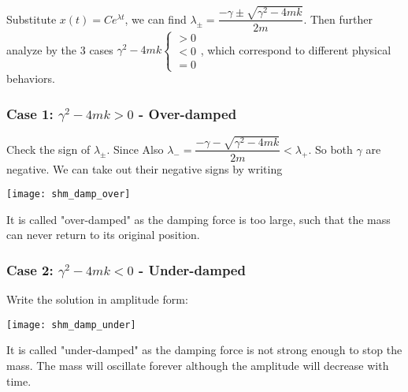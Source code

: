 \documentclass[class=article, crop=false, 12pt]{standalone}
\begin{document}
Substitute $x(t) = Ce^{\lambda t}$, we can find $\lambda_\pm = \dfrac{-\gamma \pm \sqrt{\gamma^2-4mk}}{2m}$.
Then further analyze by the 3 cases 
$\gamma^2-4mk
\begin{cases}
    >0 \\ <0 \\ =0
\end{cases}
$,
which correspond to different physical behaviors.


\subsubsection{Case 1: $\gamma^2-4mk>0$ - Over-damped}

Check the sign of $\lambda_\pm$. Since
Also $\lambda_- = \dfrac{-\gamma - \sqrt{\gamma^2-4mk}}{2m} <\lambda_+$. 
So both $\gamma$ are negative. We can take out their negative signs by writing

\begin{center}
    \texttt{[image: shm\_damp\_over]}
\end{center}

It is called "over-damped" as the damping force is too large, 
such that the mass can never return to its original position.


\subsubsection{Case 2: $\gamma^2-4mk<0$ - Under-damped}

Write the solution in amplitude form:

\begin{center}
    \texttt{[image: shm\_damp\_under]}
\end{center}

It is called "under-damped" as the damping force is not strong enough to stop the mass.
The mass will oscillate forever although the amplitude will decrease with time.
\end{document}
